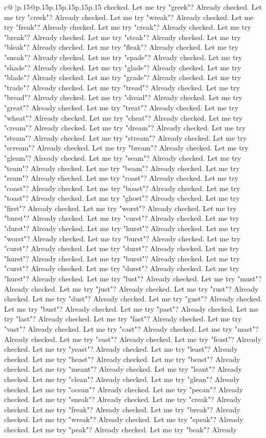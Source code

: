 \documentclass{article}
\begin{document}
{\begin{supertabular}{c@{$\;$}|p{.15\linewidth}@{}p{.15\linewidth}p{.15\linewidth}p{.15\linewidth}p{.15\linewidth}p{.15\linewidth}}
{{{checked. Let me try "greek"? Already checked. Let me try "creek"? Already checked. Let me try "wreak"? Already checked. Let me try "freak"? Already checked. Let me try "creak"? Already checked. Let me try "break"? Already checked. Let me try "steak"? Already checked. Let me try "bleak"? Already checked. Let me try "fleak"? Already checked. Let me try "sneak"? Already checked. Let me try "spade"? Already checked. Let me try "shade"? Already checked. Let me try "glade"? Already checked. Let me try "blade"? Already checked. Let me try "grade"? Already checked. Let me try "trade"? Already checked. Let me try "tread"? Already checked. Let me try "bread"? Already checked. Let me try "dread"? Already checked. Let me try "great"? Already checked. Let me try "treat"? Already checked. Let me try "wheat"? Already checked. Let me try "cheat"? Already checked. Let me try "cream"? Already checked. Let me try "dream"? Already checked. Let me try "steam"? Already checked. Let me try "stream"? Already checked. Let me try "scream"? Already checked. Let me try "bream"? Already checked. Let me try "gleam"? Already checked. Let me try "seam"? Already checked. Let me try "team"? Already checked. Let me try "beam"? Already checked. Let me try "ream"? Already checked. Let me try "roast"? Already checked. Let me try "coast"? Already checked. Let me try "boast"? Already checked. Let me try "toast"? Already checked. Let me try "ghost"? Already checked. Let me try "first"? Already checked. Let me try "worst"? Already checked. Let me try "burst"? Already checked. Let me try "curst"? Already checked. Let me try "durst"? Already checked. Let me try "hurst"? Already checked. Let me try "worst"? Already checked. Let me try "burst"? Already checked. Let me try "curst"? Already checked. Let me try "durst"? Already checked. Let me try "hurst"? Already checked. Let me try "burst"? Already checked. Let me try "curst"? Already checked. Let me try "durst"? Already checked. Let me try "hurst"? Already checked. Let me try "lust"? Already checked. Let me try "must"? Already checked. Let me try "just"? Already checked. Let me try "rust"? Already checked. Let me try "dust"? Already checked. Let me try "gust"? Already checked. Let me try "bust"? Already checked. Let me try "past"? Already checked. Let me try "last"? Already checked. Let me try "fast"? Already checked. Let me try "vast"? Already checked. Let me try "cast"? Already checked. Let me try "mast"? Already checked. Let me try "east"? Already checked. Let me try "feast"? Already checked. Let me try "yeast"? Already checked. Let me try "least"? Already checked. Let me try "heast"? Already checked. Let me try "beast"? Already checked. Let me try "meant"? Already checked. Let me try "leant"? Already checked. Let me try "clean"? Already checked. Let me try "glean"? Already checked. Let me try "ocean"? Already checked. Let me try "pecan"? Already checked. Let me try "sneak"? Already checked. Let me try "creak"? Already checked. Let me try "freak"? Already checked. Let me try "break"? Already checked. Let me try "wreak"? Already checked. Let me try "speak"? Already checked. Let me try "peak"? Already checked. Let me try "beak"? Already }}}
\end{supertabular}}
\end{document}
